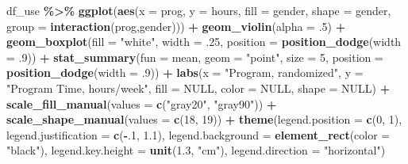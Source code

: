 \documentclass[
]{article}
\newenvironment{Shaded}{\begin{snugshade}}{\end{snugshade}}
\newcommand{\AttributeTok}[1]{\textcolor[rgb]{0.13,0.29,0.53}{#1}}
\newcommand{\ConstantTok}[1]{\textcolor[rgb]{0.56,0.35,0.01}{#1}}
\newcommand{\DecValTok}[1]{\textcolor[rgb]{0.00,0.00,0.81}{#1}}
\newcommand{\FloatTok}[1]{\textcolor[rgb]{0.00,0.00,0.81}{#1}}
\newcommand{\FunctionTok}[1]{\textcolor[rgb]{0.13,0.29,0.53}{\textbf{#1}}}
\newcommand{\NormalTok}[1]{#1}
\newcommand{\SpecialCharTok}[1]{\textcolor[rgb]{0.81,0.36,0.00}{\textbf{#1}}}
\newcommand{\StringTok}[1]{\textcolor[rgb]{0.31,0.60,0.02}{#1}}
\begin{document}
\begin{Shaded}
\begin{Highlighting}[]
\NormalTok{df\_use }\SpecialCharTok{\%\textgreater{}\%} 
  \FunctionTok{ggplot}\NormalTok{(}\FunctionTok{aes}\NormalTok{(}\AttributeTok{x =}\NormalTok{ prog,}
             \AttributeTok{y =}\NormalTok{ hours,}
             \AttributeTok{fill =}\NormalTok{ gender,}
             \AttributeTok{shape =}\NormalTok{ gender,}
             \AttributeTok{group =} \FunctionTok{interaction}\NormalTok{(prog,gender))) }\SpecialCharTok{+} 
  \FunctionTok{geom\_violin}\NormalTok{(}\AttributeTok{alpha =}\NormalTok{ .}\DecValTok{5}\NormalTok{) }\SpecialCharTok{+}
  \FunctionTok{geom\_boxplot}\NormalTok{(}\AttributeTok{fill =} \StringTok{"white"}\NormalTok{,}
               \AttributeTok{width =}\NormalTok{ .}\DecValTok{25}\NormalTok{,}
               \AttributeTok{position =} \FunctionTok{position\_dodge}\NormalTok{(}\AttributeTok{width =}\NormalTok{ .}\DecValTok{9}\NormalTok{)) }\SpecialCharTok{+}
  \FunctionTok{stat\_summary}\NormalTok{(}\AttributeTok{fun =}\NormalTok{ mean,}
               \AttributeTok{geom =} \StringTok{"point"}\NormalTok{,}
               \AttributeTok{size =} \DecValTok{5}\NormalTok{,}
               \AttributeTok{position =} \FunctionTok{position\_dodge}\NormalTok{(}\AttributeTok{width =}\NormalTok{ .}\DecValTok{9}\NormalTok{)) }\SpecialCharTok{+}
  \FunctionTok{labs}\NormalTok{(}\AttributeTok{x =} \StringTok{"Program, randomized"}\NormalTok{,}
       \AttributeTok{y =} \StringTok{"Program Time, hours/week"}\NormalTok{,}
       \AttributeTok{fill =} \ConstantTok{NULL}\NormalTok{,}
       \AttributeTok{color =} \ConstantTok{NULL}\NormalTok{,}
       \AttributeTok{shape =} \ConstantTok{NULL}\NormalTok{)  }\SpecialCharTok{+}
  \FunctionTok{scale\_fill\_manual}\NormalTok{(}\AttributeTok{values =} \FunctionTok{c}\NormalTok{(}\StringTok{"gray20"}\NormalTok{, }\StringTok{"gray90"}\NormalTok{)) }\SpecialCharTok{+}
  \FunctionTok{scale\_shape\_manual}\NormalTok{(}\AttributeTok{values =} \FunctionTok{c}\NormalTok{(}\DecValTok{18}\NormalTok{, }\DecValTok{19}\NormalTok{)) }\SpecialCharTok{+}
  \FunctionTok{theme}\NormalTok{(}\AttributeTok{legend.position =} \FunctionTok{c}\NormalTok{(}\DecValTok{0}\NormalTok{, }\DecValTok{1}\NormalTok{),}
        \AttributeTok{legend.justification =} \FunctionTok{c}\NormalTok{(}\SpecialCharTok{{-}}\NormalTok{.}\DecValTok{1}\NormalTok{, }\FloatTok{1.1}\NormalTok{),}
        \AttributeTok{legend.background =} \FunctionTok{element\_rect}\NormalTok{(}\AttributeTok{color =} \StringTok{"black"}\NormalTok{),}
        \AttributeTok{legend.key.height =} \FunctionTok{unit}\NormalTok{(}\FloatTok{1.3}\NormalTok{, }\StringTok{"cm"}\NormalTok{),}
        \AttributeTok{legend.direction =} \StringTok{"horizontal"}\NormalTok{)}
\end{Highlighting}
\end{Shaded}
\end{document}

